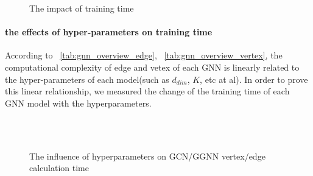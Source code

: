 \begin{figure}
    \caption{The impact of training time}
	\label{fig:exp_absolute_training_time}
\end{figure}

\paragraph{the effects of hyper-parameters on training time}

According to \tablename~\ref{tab:gnn_overview_edge}, \tablename~\ref{tab:gnn_overview_vertex}, the computational complexity of edge and vetex of each GNN is linearly related to the 
hyper-parameters of each model(such as $d_{dim}$, $K$, etc at al). 
In order to prove this linear relationship, we measured the change of the training time of each GNN model with the hyperparameters.

\begin{figure}
	\centering
    \\
    \\
    \caption{The influence of hyperparameters on GCN/GGNN vertex/edge calculation time}
	\label{fig:exp_hyperparameter_on_vertex_edge_phase_time}
\end{figure}



